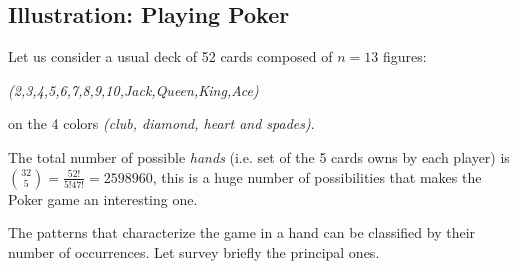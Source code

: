 \subsection{Illustration: Playing Poker}

Let us consider a usual deck of 52 cards composed of $n=13$ figures:

\textit{(2,3,4,5,6,7,8,9,10,Jack,Queen,King,Ace)} 

on the 4 colors \textit{(club, diamond, heart and spades)}.

The total number of possible \textit{hands} (i.e. set of the 5 cards owns by each player) is 
${32 \choose 5} = \frac{52!}{5! 47!} = 2 598 960$, this is a huge number of possibilities that makes the Poker game an interesting one.

The patterns that characterize the game in a hand can be classified by their number of occurrences.
Let survey briefly the principal ones.

